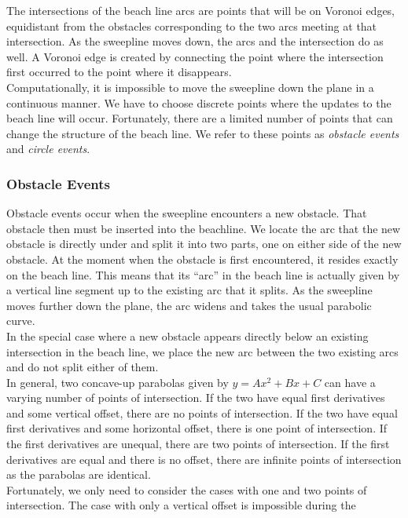 \documentclass[conference]{IEEEtran}
\begin{document}
\indent The intersections of the beach line arcs are points that will be on Voronoi
edges, equidistant from the obstacles corresponding to the two arcs meeting at
that intersection. As the sweepline moves down, the arcs and the intersection do
as well. A Voronoi edge is created by connecting the point where the intersection
first occurred to the point where it disappears.\\
\indent Computationally, it is impossible to move the sweepline down the plane in
a continuous manner. We have to choose discrete points where the updates to the
beach line will occur. Fortunately, there are a limited number of points that can
change the structure of the beach line. We refer to these points as \emph{obstacle
events} and \emph{circle events}.

\subsubsection{Obstacle Events}\label{obstacle_events}
Obstacle events occur when the sweepline encounters a new obstacle. That obstacle then
must be inserted into the beachline. We locate the arc that the new obstacle is
directly under and split it into two parts, one on either side of the new obstacle.
At the moment when the obstacle is first encountered, it resides exactly on the
beach line. This means that its ``arc'' in the beach line is actually given by a
vertical line segment up to the existing arc that it splits. As the sweepline moves
further down the plane, the arc widens and takes the usual parabolic curve.\\
\indent In the special case where a new obstacle appears directly below an existing
intersection in the beach line, we place the new arc between the two existing arcs
and do not split either of them.\\
\indent In general, two concave-up parabolas given by $y=Ax^{2}+Bx+C$ can have a varying number of points
of intersection. If the two have equal first derivatives and some vertical offset,
there are no points of intersection. If the two have equal first derivatives and
some horizontal offset, there is one point of intersection. If the first derivatives
are unequal, there are two points of intersection. If the first derivatives are
equal and there is no offset, there are infinite points of intersection as the
parabolas are identical.\\
\indent Fortunately, we only need to consider the cases with one and two points
of intersection. The case with only a vertical offset is impossible during the
\end{document}
